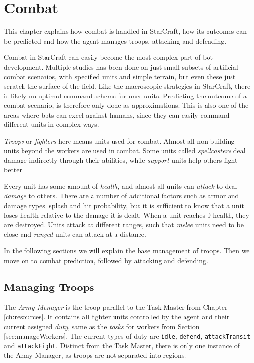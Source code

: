 \chapter{Combat}
\label{ch:combat}
This chapter explains how combat is handled in StarCraft, how its outcomes can be predicted and how the agent manages troops, attacking and defending.

Combat in StarCraft can easily become the most complex part of bot development. Multiple studies has been done on just small subsets of artificial combat scenarios, with specified units and simple terrain, but even these just scratch the surface of the field. Like the macroscopic strategies in StarCraft, there is likely no optimal command scheme for ones units. Predicting the outcome of a combat scenario, is therefore only done as approximations. This is also one of the areas where bots can excel against humans, since they can easily command different units in complex ways.

\emph{Troops} or \emph{fighters} here means units used for combat. Almost all non-building units beyond the workers are used in combat. Some units called \emph{spellcasters} deal damage indirectly through their abilities, while \emph{support} units help others fight better.

Every unit has some amount of \emph{health}, and almost all units can \emph{attack} to deal \emph{damage} to others. There are a number of additional factors such as armor and damage types, splash and hit probability, but it is sufficient to know that a unit loses health relative to the damage it is dealt. When a unit reaches 0 health, they are destroyed. Units attack at different ranges, such that \emph{melee} units need to be close and \emph{ranged} units can attack at a distance.

In the following sections we will explain the base management of troops. Then we move on to combat prediction, followed by attacking and defending.

\section{Managing Troops}
The \emph{Army Manager} is the troop parallel to the Task Master from Chapter \ref{ch:resources}. It contains all fighter units controlled by the agent and their current assigned \emph{duty}, same as the \emph{tasks} for workers from Section \ref{sec:manageWorkers}. The current types of duty are \texttt{idle}, \texttt{defend}, \texttt{attackTransit} and \texttt{attackFight}. Distinct from the Task Master, there is only one instance of the Army Manager, as troops are not separated into regions.

